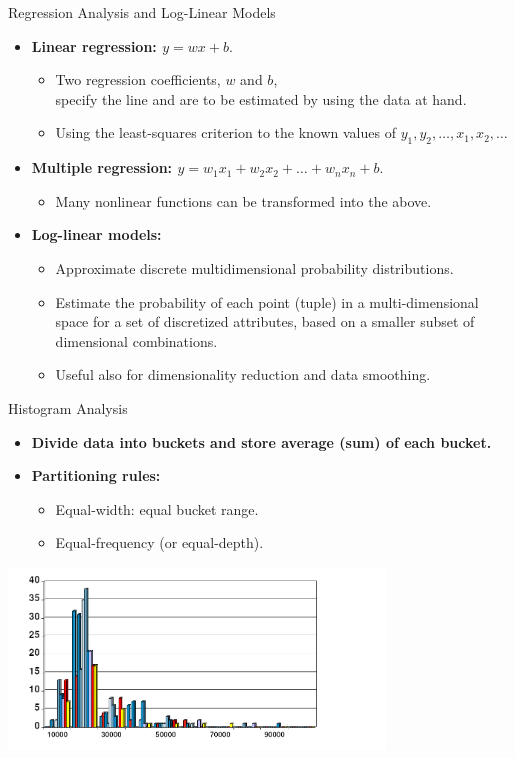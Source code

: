 \begin{frame}{Regression Analysis and Log-Linear Models}
	\begin{itemize}
		\item \textbf{Linear regression: $y = wx + b$}.
		\begin{itemize}
			\item Two regression coefficients, $w$ and $b$, \\
			specify the line and are to be estimated by using the data at hand.
			\item Using the least-squares criterion to the known values of 
			$y_1,y_2, \ldots, x_1,x_2,\ldots$
		\end{itemize}
		\item \textbf{Multiple regression: $y = w_1 x_1 + w_2 x_2 + \ldots + 
		w_n x_n + b$}.
		\begin{itemize}
			\item Many nonlinear functions can be transformed into the above.
		\end{itemize}
		\item \textbf{Log-linear models:}
		\begin{itemize}
			\item Approximate discrete multidimensional probability 
			distributions.
			\item Estimate the probability of each point (tuple) in a 
			multi-dimensional space for a set of discretized attributes, based 
			on a smaller subset of dimensional combinations.
			\item Useful also for dimensionality reduction and data smoothing.
		\end{itemize}
	\end{itemize}
\end{frame}

\begin{frame}{Histogram Analysis}
	\begin{itemize}
		\item \textbf{Divide data into buckets and store average (sum) of each 
		bucket.}
		\item \textbf{Partitioning rules:}
		\begin{itemize}
			\item Equal-width: equal bucket range.
			\item Equal-frequency (or equal-depth).
		\end{itemize}
	\end{itemize}
	\centering
	\includegraphics[width=10cm]{img/histogram.png}
\end{frame}

